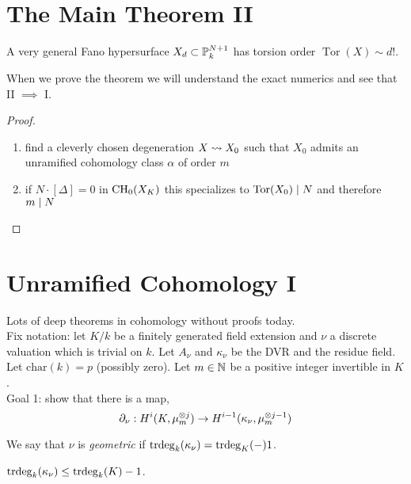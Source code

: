 \documentclass[12pt]{article}
\DeclareMathOperator{\torsion}{\mathrm{Tor}}
\begin{document}
\section{The Main Theorem II}

\begin{theorem}[Schreieder II]
A very general Fano hypersurface $X_d \subset \P^{N+1}_k$ has torsion order $\torsion(X) \sim d!$. 
\end{theorem}

\begin{rmk}
When we prove the theorem we will understand the exact numerics and see that II $\implies$ I.
\end{rmk}

\begin{proof}
\begin{enumerate}
\item find a cleverly chosen degeneration $X \spto X_0$ such that $X_0$ admits an unramified cohomology class $\alpha$ of order $m$

\item if $N \cdot [\Delta] = 0$ in $\CH_0(X_K)$ this specializes to $\torsion(X_0) \divides N$ and therefore $m \divides N$
\end{enumerate}
\end{proof}

\section{Unramified Cohomology I}

Lots of deep theorems in \etale cohomology without proofs today.
\bigskip\\
Fix notation: let $K / k$ be a finitely generated field extension and $\nu$ a discrete valuation which is trivial on $k$. Let $A_\nu$ and $\kappa_\nu$ be the DVR and the residue field. Let $\mathrm{char}(k) = p$ (possibly zero). Let $m \in \N$ be a positive integer invertible in $K$. 
\bigskip\\
Goal 1: show that there is a map,
\[ \partial_\nu : H^i(K, \mu_m^{\ot j}) \to H^{i-1}(\kappa_\nu, \mu_m^{\ot {j-1}}) \]

\begin{defn}
We say that $\nu$ is \textit{geometric} if $\trdeg{k}{\kappa_\nu} = \trdeg{K} - 1$.
\end{defn}

\begin{theorem}[Abyankar]
$\trdeg{k}{\kappa_\nu} \le \trdeg{k}{K} - 1$.
\end{theorem}
\end{document}
